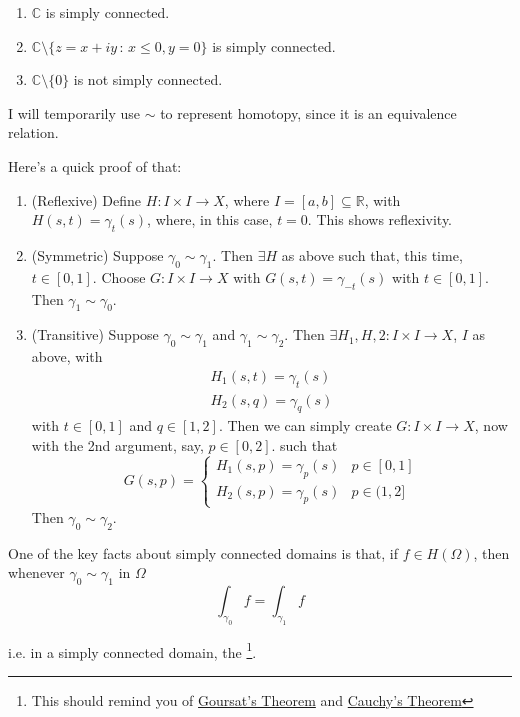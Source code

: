 \documentclass[11pt, oneside]{book}
\begin{document}
\begin{ex}
  \begin{enumerate}
    \item $\mathbb{C}$ is simply connected.
    \item $\mathbb{C} \setminus \{z = x + iy \, : \, x \leq 0, y = 0\}$ is simply connected.
    \item $\mathbb{C} \setminus \{0\}$ is not simply connected.
  \end{enumerate}
\end{ex}

\begin{note}
  I will temporarily use $\sim$ to represent homotopy, since it is an equivalence relation.

  Here's a quick proof of that:
  \begin{enumerate}
    \item (Reflexive) Define $H : I \times I \to X$, where $I = [a, b] \subseteq \mathbb{R}$, with $H(s, t) = \gamma_t(s)$, where, in this case, $t = 0$. This shows reflexivity.

    \item (Symmetric) Suppose $\gamma_0 \sim \gamma_1$. Then $\exists H$ as above such that, this time, $t \in [0, 1]$. Choose $G : I \times I \to X$ with $G(s, t) = \gamma_{-t}(s)$ with $t \in [0, 1]$. Then $\gamma_1 \sim \gamma_0$.

    \item (Transitive) Suppose $\gamma_0 \sim \gamma_1$ and $\gamma_1 \sim \gamma_2$. Then $\exists H_1, H,2 : I \times I \to X$, $I$ as above, with
    \begin{gather*}
      H_1(s, t) = \gamma_t(s) \\
      H_2(s, q) = \gamma_q(s)
    \end{gather*}
    with $t \in [0, 1]$ and $q \in [1, 2]$. Then we can simply create $G : I \times I \to X$, now with the 2nd argument, say, $p \in [0, 2]$. such that
    \begin{equation*}
      G(s, p) = \begin{cases}
        H_1(s, p) = \gamma_p (s) & p \in [0, 1] \\
        H_2(s, p) = \gamma_p (s) & p \in (1, 2]
      \end{cases}
    \end{equation*}
    Then $\gamma_0 \sim \gamma_2$.
  \end{enumerate}

  One of the key facts about simply connected domains is that, if $f \in H(\Omega)$, then whenever $\gamma_0 \sim \gamma_1$ in $\Omega$
  \begin{equation*}
    \int_{\gamma_0} f = \int_{\gamma_1} f
  \end{equation*}

  i.e. in a simply connected domain, the \footnote{This should remind you of \hyperref[thm:goursat_s_theorem]{Goursat's Theorem} and \hyperref[thm:cauchy_s_theorem_for_convex_set]{Cauchy's Theorem}}.
\end{note}
\end{document}
